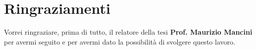 \chapter*{Ringraziamenti}
    \begin{large}
    Vorrei ringraziare, prima di tutto, il relatore della tesi \textbf{Prof. Maurizio Mancini}
    per avermi seguito e per avermi dato la possibilità di svolgere questo lavoro.
    \end{large}